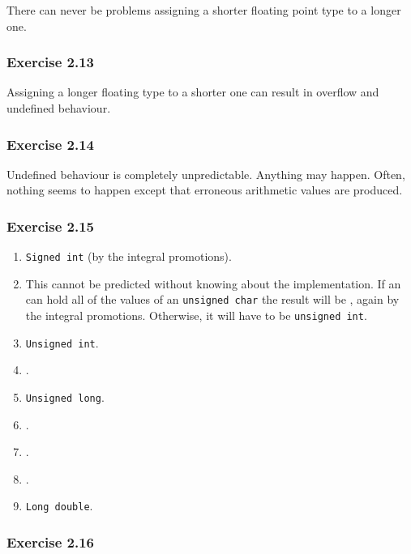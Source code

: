    There can never be problems assigning a shorter floating point type to
    a longer one.


  

  \subsubsection*{Exercise 2.13}

   Assigning a longer floating type to a shorter one can result in overflow
    and undefined behaviour.


  

  \subsubsection*{Exercise 2.14}

   Undefined behaviour is completely unpredictable. Anything may happen.
    Often, nothing seems to happen except that erroneous arithmetic values are
    produced.


  

  \subsubsection*{Exercise 2.15}

   \begin{enumerate}
    \item \texttt{Signed int} (by the integral promotions).

    \item This cannot be predicted without knowing about the implementation.
     If an \kint{} can hold all of the values of an \texttt{unsigned
     char} the result will be \kint, again by the integral
     promotions. Otherwise, it will have to be \texttt{unsigned int}.

    \item \texttt{Unsigned int}.
    \item \klong.
    \item \texttt{Unsigned long}.
    \item \klong.
    \item \float.
    \item \float.
    \item \texttt{Long double}.
   \end{enumerate}

  

  \subsubsection*{Exercise 2.16}

